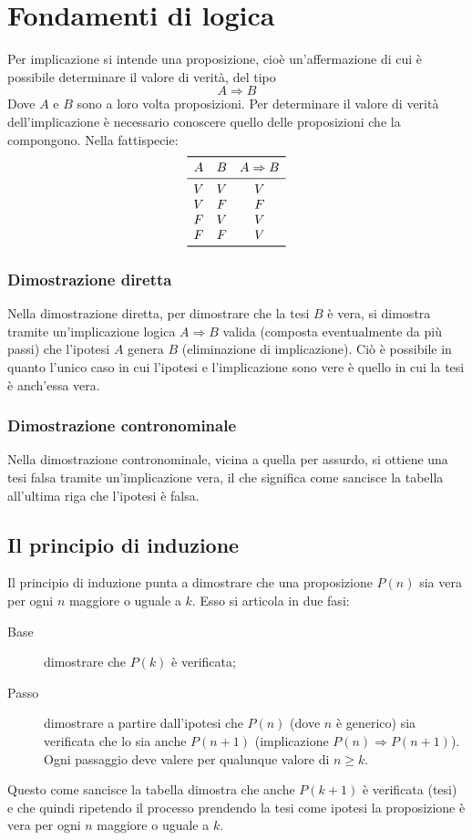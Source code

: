 \section{Fondamenti di logica}
Per implicazione si intende una proposizione, cioè un'affermazione di cui è possibile determinare il valore di verità, del tipo
\[
	A\Rightarrow B
\]
Dove $A$ e $B$ sono a loro volta proposizioni.
Per determinare il valore di verità dell'implicazione è necessario conoscere quello delle proposizioni che la compongono. Nella fattispecie:
\[
	\begin{array}{ccc}
		\toprule
		A & B & A\Rightarrow B \\
		\midrule
		V & V & V              \\
		V & F & F              \\
		F & V & V              \\
		F & F & V              \\
		\bottomrule
	\end{array}
\]
\subsubsection{Dimostrazione diretta}
Nella dimostrazione diretta, per dimostrare che la tesi $B$ è vera, si dimostra tramite un'implicazione logica $A\Rightarrow B$ valida (composta eventualmente da più passi) che l'ipotesi $A$ genera $B$ (eliminazione di implicazione). Ciò è possibile in quanto l'unico caso in cui l'ipotesi e l'implicazione sono vere è quello in cui la tesi è anch'essa vera.

\subsubsection{Dimostrazione contronominale}
Nella dimostrazione contronominale, vicina a quella per assurdo, si ottiene una tesi falsa tramite un'implicazione vera, il che significa come sancisce la tabella all'ultima riga che l'ipotesi è falsa.


\subsection{Il principio di induzione}
Il principio di induzione punta a dimostrare che una proposizione $P(n)$ sia vera per ogni $n$ maggiore o uguale a $k$. Esso si articola in due fasi:
\begin{description}
	\item[Base] dimostrare che $P(k)$ è verificata;
	\item[Passo] dimostrare a partire dall'ipotesi che $P(n)$ (dove $n$ è generico) sia verificata che lo sia anche $P(n+1)$ (implicazione $P(n)\Rightarrow P(n+1)$). Ogni passaggio deve valere per qualunque valore di $n\geq k$.
\end{description}
Questo come sancisce la tabella dimostra che anche $P(k+1)$ è verificata (tesi) e che quindi ripetendo il processo prendendo la tesi come ipotesi la proposizione è vera per ogni $n$ maggiore o uguale a $k$.

